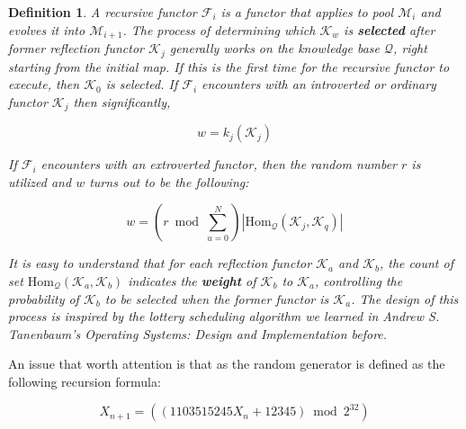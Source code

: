 \documentclass{aims}
\numberwithin{equation}{section}
\newtheorem{definition}{Definition}	%
\numberwithin{theorem}{section}	%
\numberwithin{axiom}{section}	%
\numberwithin{definition}{section}	%
\begin{document}
	\begin{definition}
		A recursive functor \(\mathcal{F}_i\) is a functor that applies to pool \(\mathcal{M}_i\) and evolves it into \(\mathcal{M}_{i+1}\). The process of determining which \(\mathcal{K}_w\) is \textbf{ selected} after former reflection functor \(\mathcal{K}_j\) generally works on the knowledge base \(\mathcal{Q}\), right starting from the initial map. If this is the first time for the recursive functor to execute, then \(\mathcal{K}_0\) is selected. If \(\mathcal{F}_i\) encounters with an introverted or ordinary functor \(\mathcal{K}_j\) then significantly,
		
		\begin{equation}
			w = k_j\left(\mathcal{K}_j\right)
		\end{equation}
		
		If \(\mathcal{F}_i\) encounters with an extroverted functor, then the random number \(\mathit{r}\) is utilized and \(w\) turns out to be the following:
		
		\begin{equation}
			w = (\mathit{r} \bmod \sum _{u=0}^N )\left|\text{Hom}_{\mathcal{Q}}\left(\mathcal{K}_j,\mathcal{K}_q\right)\right|
		\end{equation}
		
		It is easy to understand that for each reflection functor \(\mathcal{K}_a\) and \(\mathcal{K}_b\), the count of set \(\text{Hom}_{\mathcal{Q}}\left(\mathcal{K}_a,\mathcal{K}_b\right)\) indicates the \textbf{ weight} of \(\mathcal{K}_b\) to \(\mathcal{K}_a\), controlling the probability of \(\mathcal{K}_b\) to be selected when the former functor is \(\mathcal{K}_a\). The design of this process is inspired by the lottery scheduling algorithm we learned in Andrew S. Tanenbaum{'}s Operating Systems: Design and Implementation \cite{Tanenbaum2015} before.
	\end{definition}
	
	An issue that worth attention is that as the random generator is defined as the following recursion formula: \cite{Entacher1997}
	
	\begin{equation*}
		X_{n+1}=(\left(1103515245 X_n+12345\right) \bmod 2^{32})
	\end{equation*}
	
\end{document}
